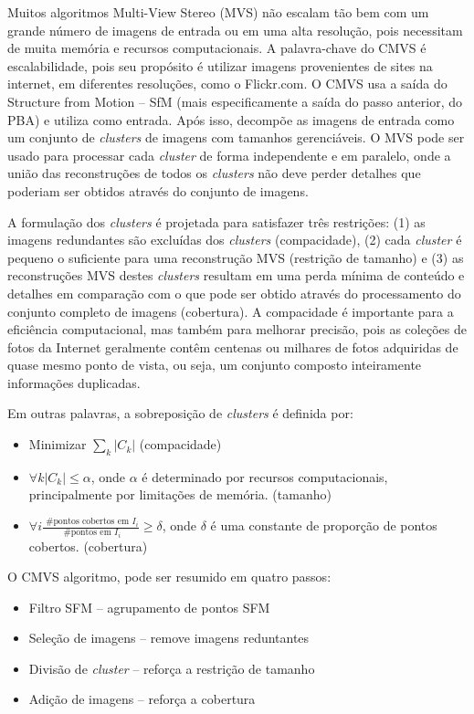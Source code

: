 \begin{itemize}
Muitos algoritmos Multi-View Stereo (MVS) não escalam tão bem com um grande número de imagens de entrada ou em uma alta resolução, pois necessitam de muita memória e recursos computacionais. A palavra-chave do CMVS é escalabilidade, pois seu propósito é utilizar imagens provenientes de sites na internet, em diferentes resoluções, como o Flickr.com.  
O CMVS usa a saída do Structure from Motion -- SfM (mais especificamente a saída do passo anterior, do PBA) e utiliza como entrada. Após isso, decompõe as imagens de entrada como um conjunto de {\it clusters} de imagens com tamanhos gerenciáveis. O MVS pode ser usado para processar cada {\it cluster} de forma independente e em paralelo, onde a união das reconstruções de todos os {\it clusters} não deve perder detalhes que poderiam ser obtidos através do conjunto de imagens.

A formulação dos {\it clusters} é projetada para satisfazer três restrições: (1) as imagens redundantes são excluídas dos {\it clusters} (compacidade), (2) cada {\it cluster} é pequeno o suficiente para uma reconstrução MVS (restrição de tamanho) e (3) as reconstruções MVS destes {\it clusters} resultam em uma perda mínima de conteúdo e detalhes em comparação com o que pode ser obtido através do processamento do conjunto completo de imagens (cobertura).
A compacidade é importante para a eficiência computacional, mas também para melhorar precisão, pois as coleções de fotos da Internet geralmente contêm centenas ou milhares de fotos adquiridas de quase mesmo ponto de vista, ou seja, um conjunto composto inteiramente informações duplicadas.

Em outras palavras, a sobreposição de {\it clusters} é definida por:

\begin{itemize}
\item Minimizar $\sum_{k} |C_k|$ (compacidade)
\item $\forall k |C_k| \le \alpha$, onde $\alpha$ é determinado por recursos computacionais, principalmente por limitações de memória. (tamanho)
\item $\forall i \frac{\text{ \# pontos cobertos em } I_i}{\text{ \# pontos em } I_i} \ge \delta$, onde $\delta$ é uma constante de proporção de pontos cobertos. (cobertura)
\end{itemize}

O CMVS algoritmo, pode ser resumido em quatro passos:

\begin{itemize}
\item Filtro SFM -- agrupamento de pontos SFM
\item Seleção de imagens -- remove imagens reduntantes
\item Divisão de {\it cluster} -- reforça a restrição de tamanho
\item Adição de imagens -- reforça a cobertura
\end{itemize}


\end{itemize}

